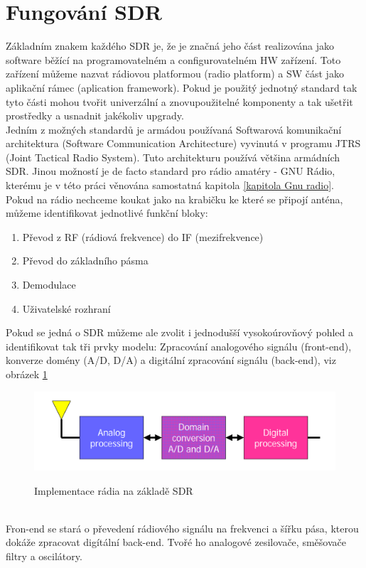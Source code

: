 \documentclass{ctuthesis}
\begin{document}
\section{Fungování SDR}
Základním znakem každého SDR je, že je značná jeho část realizována jako software běžící na programovatelném a configurovatelném HW zařízení. Toto zařízení můžeme nazvat rádiovou platformou (radio platform) a SW část jako aplikační rámec (aplication framework). Pokud je použitý jednotný standard tak tyto části mohou tvořit univerzální a znovupoužitelné komponenty a tak ušetřit prostředky a usnadnit jakékoliv upgrady.\\
Jedním z možných standardů je armádou používaná Softwarová komunikační architektura (Software Communication Architecture) vyvinutá  v programu JTRS (Joint Tactical Radio System). Tuto architekturu používá většina armádních SDR. \cite{sdr2006}
Jinou možností je de facto standard pro rádio amatéry - GNU Rádio, kterému je v této práci věnována samostatná kapitola \ref{kapitola Gnu radio}.\\
Pokud na rádio nechceme koukat jako na krabičku ke které se připojí anténa, můžeme identifikovat jednotlivé funkční bloky:
\begin{enumerate}
\item
Převod z RF (rádiová frekvence) do IF (mezifrekvence)
\item
Převod do základního pásma
\item
Demodulace
\item
Uživatelské rozhraní
\end{enumerate}
Pokud se jedná o SDR můžeme ale zvolit i jednodušší vysokoúrovňový pohled a identifikovat tak tři prvky modelu: Zpracování analogového signálu (front-end), konverze domény (A/D, D/A) a digitální zpracování signálu (back-end), viz obrázek \ref{blokySDR}
\begin{figure}
\caption{Implementace rádia na základě SDR\cite{sdr2006}}
\includegraphics[width=1\textwidth]{./images/funkcniSDRbloky.png}
\label{blokySDR}
\end{figure}
\\
Fron-end se stará o převedení rádiového signálu na frekvenci a šířku pása, kterou dokáže zpracovat digítální back-end. Tvořé ho analogové zesilovače, směšovače filtry a oscilátory.\\
\end{document}
